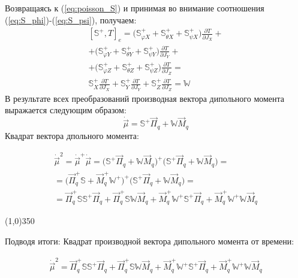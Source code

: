 Возвращаясь к (\ref{eq:poisson_S}) и принимая во внимание соотношения (\ref{eq:S_phi})-(\ref{eq:S_psi}), получаем:
\begin{equation}
\label{eq:W}
\begin{aligned}
\left[\mathbb{S}^{+},T\right]_e = \Big( \mathbb{S}^{+}_{\varphi X} + \mathbb{S}^{+}_{\theta X}+ \mathbb{S}^{+}_{\psi X}\Big) \frac{\partial T}{\partial J_X} + \\
+ \Big( \mathbb{S}^{+}_{\varphi Y} + \mathbb{S}^{+}_{\theta Y}+ \mathbb{S}^{+}_{\psi Y}\Big) \frac{\partial T}{\partial J_Y} + \\
+ \Big( \mathbb{S}^{+}_{\varphi Z} + \mathbb{S}^{+}_{\theta Z}+ \mathbb{S}^{+}_{\psi Z}\Big) \frac{\partial T}{\partial J_Z} = \\
\mathbb{S}^{+}_{X} \frac{\partial T}{\partial J_X} + \mathbb{S}^{+}_{Y} \frac{\partial T}{\partial J_Y} +
\mathbb{S}^{+}_{Z} \frac{\partial T}{\partial J_Z} = \mathbb{W}
\end{aligned}
\end{equation}
В результате всех преобразований производная вектора дипольного момента выражается следующим образом: 
\[
\dot{\vec{\mu}} = \mathbb{S}^{+}\vec{\Pi}_q + \mathbb{W} \vec{M}_q
\]
Квадрат вектора дпольного момента:

\begin{equation}
\begin{aligned}
\dot{\vec\mu}^2 = \dot{\vec{\mu}}^{+}\dot{\vec{\mu}} =  \big(\mathbb{S}^{+}\vec{\Pi}_q + \mathbb{W} \vec{M}_q\big)^{+}\big(\mathbb{S}^{+}\vec{\Pi}_q + \mathbb{W} \vec{M}_q\big) = \\
= \big(\vec{\Pi}_q^{+}\mathbb{S} +  \vec{M}_q^{+}\mathbb{W}^{+}\big)^{+}\big(\mathbb{S}^{+}\vec{\Pi}_q + \mathbb{W} \vec{M}_q\big) =\\
= \vec{\Pi}_q^{+}\mathbb{S}\mathbb{S}^{+}\vec{\Pi}_q + \vec{\Pi}_q^{+}\mathbb{S} \mathbb{W} \vec{M}_q +
 \vec{M}_q^{+}\mathbb{W}^{+}\mathbb{S}^{+}\vec{\Pi}_q +  \vec{M}_q^{+}\mathbb{W}^{+} \mathbb{W} \vec{M}_q
\end{aligned}
\end{equation}



\begin{center}
\line(1,0){350}
\end{center}

Подводя итоги:
Квадрат производной вектора дипольного момента от времени:

\begin{equation}
\label{eq:dip_squared}
\begin{aligned}
\dot{\vec\mu}^2 =  \vec{\Pi}_q^{+}\mathbb{S}\mathbb{S}^{+}\vec{\Pi}_q + \vec{\Pi}_q^{+}\mathbb{S} \mathbb{W} \vec{M}_q +
 \vec{M}_q^{+}\mathbb{W}^{+}\mathbb{S}^{+}\vec{\Pi}_q +  \vec{M}_q^{+}\mathbb{W}^{+} \mathbb{W} \vec{M}_q
\end{aligned}
\end{equation}

